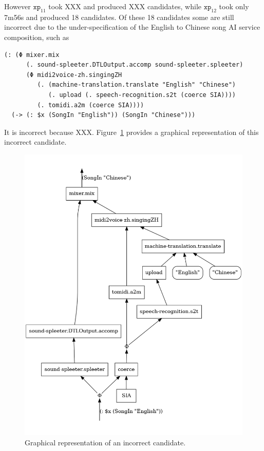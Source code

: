 \documentclass[]{report}
\begin{document}
However $\texttt{xp}_{11}$ took XXX and
produced XXX candidates, while $\texttt{xp}_{12}$ took only 7m56s and
produced 18 candidates.  Of these 18 candidates some are still
incorrect due to the under-specification of the English to Chinese
song AI service composition, such as
\begin{small}
\begin{verbatim}
(: (Φ mixer.mix
      (. sound-spleeter.DTLOutput.accomp sound-spleeter.spleeter)
      (Φ midi2voice-zh.singingZH
         (. (machine-translation.translate "English" "Chinese")
            (. upload (. speech-recognition.s2t (coerce SIA))))
         (. tomidi.a2m (coerce SIA))))
  (-> (: $x (SongIn "English")) (SongIn "Chinese")))
\end{verbatim}
\end{small}
It is incorrect because XXX.  Figure~\ref{fig:inccnd} provides a
graphical representation of this incorrect candidate.
\begin{figure}[H]
  \centering
  \includegraphics[scale=0.35]{figs/incorrect-cnd.png}
  \caption{Graphical representation of an incorrect candidate.}
  \label{fig:inccnd}
\end{figure}
\end{document}
